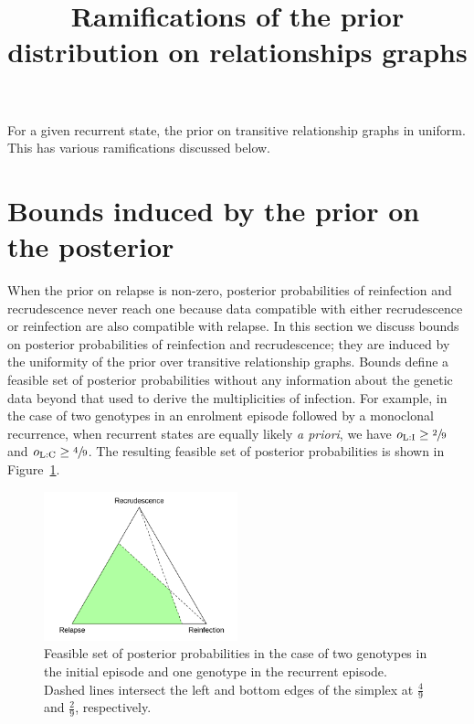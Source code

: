 \documentclass{article}
\title{Ramifications of the prior distribution on relationships graphs}
\date{}
\author{}
\begin{document}
\maketitle

For a given recurrent state, the prior on transitive relationship graphs in uniform. This has various ramifications discussed below. 

\section*{Bounds induced by the prior on the posterior}

When the prior on relapse is non-zero, posterior probabilities of reinfection and recrudescence never reach one because data compatible with either recrudescence or reinfection are also compatible with relapse. In this section we discuss bounds on posterior probabilities of reinfection and recrudescence; they are induced by the uniformity of the prior over transitive relationship graphs. Bounds define a feasible set of posterior probabilities without any information about the genetic data beyond that used to derive the multiplicities of infection. For example, in the case of two genotypes in an enrolment episode followed by a monoclonal recurrence, when recurrent states are equally likely \textit{a priori}, we have $o_{\mathrm{L}:\mathrm{I}} \ge \sfrac{2}{9}$ and $o_{\mathrm{L}:\mathrm{C}} \ge \sfrac{4}{9}$. The resulting feasible set of posterior probabilities is shown in Figure~\ref{fig:feasible_set}.

\begin{figure}[h]
\includegraphics[width=0.5\textwidth]{figures/feasible_moi_2_1.PNG}
\centering
\caption{Feasible set of posterior probabilities in the case of two genotypes in the initial episode and one genotype in the recurrent episode. Dashed lines intersect the left and bottom edges of the simplex at $\frac{4}{9}$ and $\frac{2}{9}$, respectively.}\label{fig:feasible_set}
\end{figure}
\end{document}
